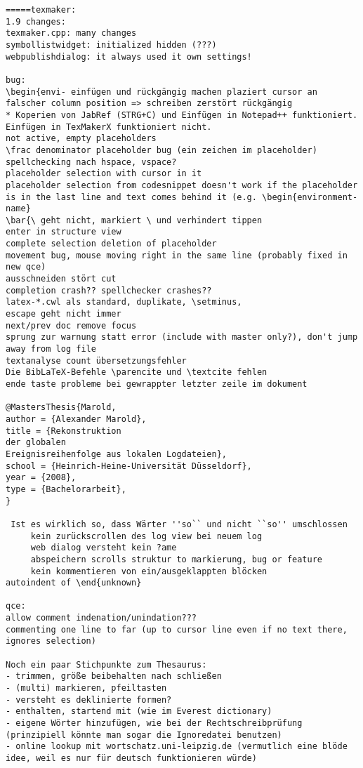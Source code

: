 \documentclass[10pt,a4paper,landscape]{report}
\begin{document}
\begin{verbatim}
=====texmaker: 
1.9 changes:
texmaker.cpp: many changes
symbollistwidget: initialized hidden (???)
webpublishdialog: it always used it own settings!

bug: 
\begin{envi- einfügen und rückgängig machen plaziert cursor an falscher column position => schreiben zerstört rückgängig
* Koperien von JabRef (STRG+C) und Einfügen in Notepad++ funktioniert. Einfügen in TexMakerX funktioniert nicht.
not active, empty placeholders
\frac denominator placeholder bug (ein zeichen im placeholder)
spellchecking nach hspace, vspace?
placeholder selection with cursor in it
placeholder selection from codesnippet doesn't work if the placeholder is in the last line and text comes behind it (e.g. \begin{environment-name}
\bar{\ geht nicht, markiert \ und verhindert tippen
enter in structure view
complete selection deletion of placeholder
movement bug, mouse moving right in the same line (probably fixed in new qce)
ausschneiden stört cut
completion crash?? spellchecker crashes??
latex-*.cwl als standard, duplikate, \setminus, 
escape geht nicht immer
next/prev doc remove focus
sprung zur warnung statt error (include with master only?), don't jump away from log file
textanalyse count übersetzungsfehler
Die BibLaTeX-Befehle \parencite und \textcite fehlen
ende taste probleme bei gewrappter letzter zeile im dokument

@MastersThesis{Marold,
author = {Alexander Marold},
title = {Rekonstruktion 
der globalen 
Ereignisreihenfolge aus lokalen Logdateien},
school = {Heinrich-Heine-Universität Düsseldorf},
year = {2008},
type = {Bachelorarbeit},
}

 Ist es wirklich so, dass Wärter ''so`` und nicht ``so'' umschlossen
     kein zurückscrollen des log view bei neuem log
     web dialog versteht kein ?ame
     abspeichern scrolls struktur to markierung, bug or feature
     kein kommentieren von ein/ausgeklappten blöcken
autoindent of \end{unknown}

qce:
allow comment indenation/unindation???
commenting one line to far (up to cursor line even if no text there, ignores selection)

Noch ein paar Stichpunkte zum Thesaurus:
- trimmen, größe beibehalten nach schließen
- (multi) markieren, pfeiltasten
- versteht es deklinierte formen?
- enthalten, startend mit (wie im Everest dictionary)
- eigene Wörter hinzufügen, wie bei der Rechtschreibprüfung (prinzipiell könnte man sogar die Ignoredatei benutzen)
- online lookup mit wortschatz.uni-leipzig.de (vermutlich eine blöde idee, weil es nur für deutsch funktionieren würde)


\end{verbatim}
\end{document}
